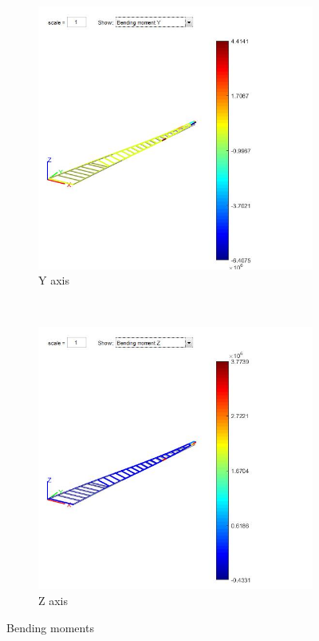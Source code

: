 \begin{figure}[h]
	\centering
	\begin{subfigure}{0.45\textwidth}
		\includegraphics[width=\textwidth]{img/BendY.jpg}
		\caption{Y axis}
		\label{fig:bending_y}
	\end{subfigure}
	~ %
	\begin{subfigure}{0.45\textwidth}
		\includegraphics[width=\textwidth]{img/BendZ.jpg}
		\caption{Z axis}
		\label{fig:bending_z}
	\end{subfigure}
	\caption{Bending moments}
	\label{fig:bending}
\end{figure}

